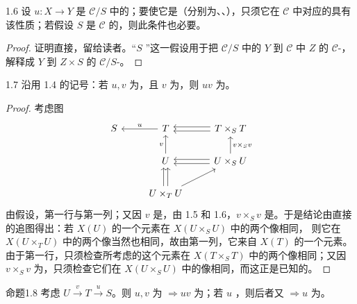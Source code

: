 \begin{SGAresult}{}{1.6}
设 $u:X\to Y$ 是 $\mathcal C/S$ 中的；要使它是（分别为、、），只须它在 $\mathcal C$ 中对应的具有该性质；若假设 $S$ 是 $\mathcal C$ 的，则此条件也必要。
\end{SGAresult}
\begin{proof}
证明直接，留给读者。“$S$ ”这一假设用于把 $\mathcal C/S$ 中的 $Y$ 到 $\mathcal C$ 中 $Z$ 的 $\mathcal C$-，解释成 $Y$ 到 $Z\times S$ 的 $\mathcal C/S$-。
\end{proof}
\begin{SGAresult}{}{1.7}
沿用 1.4 的记号：若 $u,v$ 为，且 $v$ 为，则 $uv$ 为。
\end{SGAresult}
\begin{proof}
考虑图
\[
\begin{tikzcd}
S&T\arrow[l,"u"']&T\times_S T\arrow[l,shift left=.5ex]\arrow[l,shift right=.5ex]\\
&U\arrow[u,"v"]&U\times_S U\arrow[u,"v\times_S v"']\arrow[l,shift left=.5ex]\arrow[l,shift right=.5ex]\\
&U\times_T U\arrow[u,shift left=.5ex]\arrow[u,shift right=.5ex]\arrow[ur]
\end{tikzcd}
\]
由假设，第一行与第一列；又因 $v$ 是，由 1.5 和 1.6，$v\times_S v$ 是。于是结论由直接的追图得出：若 $X(U)$ 的一个元素在 $X(U\times_S U)$ 中的两个像相同，
则它在 $X(U\times_T U)$ 中的两个像当然也相同，故由第一列，它来自 $X(T)$ 的一个元素。由于第一行，只须检查所考虑的这个元素在 $X(T\times_S T)$ 中的两个像相同；又因 $v\times_S v$ 为，只须检查它们在 $X(U\times_S U)$ 中的像相同，而这正是已知的。
\end{proof}
\begin{SGAresult}{命题}{1.8}
考虑 $U\xrightarrow{v}T\xrightarrow{u}S$。则 $u,v$ 为 $\Rightarrow uv$ 为；若 $u$ ，则后者又 $\Rightarrow u$ 为。
\end{SGAresult}
